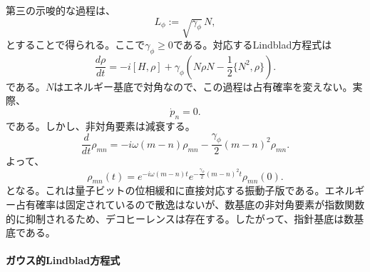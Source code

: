 \documentclass[a4paper,11pt,oneside]{article}
\theoremstyle{definition}
\numberwithin{equation}{section}
\begin{document}
第三の示唆的な過程は、
\begin{equation}
L_\phi := \sqrt{\gamma_\phi}\,N ,
\end{equation}
とすることで得られる。ここで$\gamma_\phi\geq 0$である。対応するLindblad方程式は
\begin{equation}\label{oscdephasing}
\frac{d\rho}{dt}
=
-i[H,\rho]
+
\gamma_\phi
\left(
N\rho N
-\frac12\{N^2,\rho\}
\right) .
\end{equation}
である。$N$はエネルギー基底で対角なので、この過程は占有確率を変えない。実際、
\begin{equation}
\dot p_n = 0 .
\end{equation}
である。しかし、非対角要素は減衰する。
\begin{equation}
\frac{d}{dt}\rho_{mn}
=
-i\omega(m-n)\rho_{mn}
-\frac{\gamma_\phi}{2}(m-n)^2\rho_{mn} .
\end{equation}
よって、
\begin{equation}
\rho_{mn}(t)
=
e^{-i\omega(m-n)t}
e^{-\frac{\gamma_\phi}{2}(m-n)^2 t}
\rho_{mn}(0) .
\end{equation}
となる。これは量子ビットの位相緩和に直接対応する振動子版である。エネルギー占有確率は固定されているので散逸はないが、数基底の非対角要素が指数関数的に抑制されるため、デコヒーレンスは存在する。したがって、指針基底は数基底である。







\paragraph{ガウス的Lindblad方程式}
\end{document}
